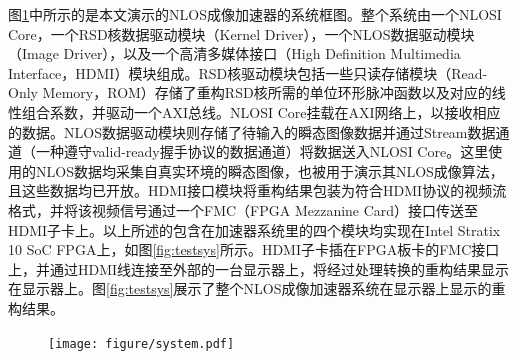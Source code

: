 \documentclass[master]{shtthesis}             %
\begin{document}
图\ref{fig:nlossys}中所示的是本文演示的NLOS成像加速器的系统框图。整个系统由一个NLOSI Core，一个RSD核数据驱动模块（Kernel Driver），一个NLOS数据驱动模块（Image Driver），以及一个高清多媒体接口（High Definition Multimedia Interface，HDMI）模块组成。RSD核驱动模块包括一些只读存储模块（Read-Only Memory，ROM）存储了重构RSD核所需的单位环形脉冲函数以及对应的线性组合系数，并驱动一个AXI总线。NLOSI Core挂载在AXI网络上，以接收相应的数据。NLOS数据驱动模块则存储了待输入的瞬态图像数据并通过Stream数据通道（一种遵守valid-ready握手协议的数据通道）将数据送入NLOSI Core。这里使用的NLOS数据均采集自真实环境的瞬态图像，也被\citet{Liu,Liu2019}用于演示其NLOS成像算法，且这些数据均已开放。HDMI接口模块将重构结果包装为符合HDMI协议的视频流格式，并将该视频信号通过一个FMC（FPGA Mezzanine Card）接口传送至HDMI子卡上。以上所述的包含在加速器系统里的四个模块均实现在Intel Stratix 10 SoC FPGA上，如图\ref{fig:testsys}所示。HDMI子卡插在FPGA板卡的FMC接口上，并通过HDMI线连接至外部的一台显示器上，将经过处理转换的重构结果显示在显示器上。图\ref{fig:testsys}展示了整个NLOS成像加速器系统在显示器上显示的重构结果。
\begin{table}[!t]
    \centering
    \label{tab:perf_comp}
\end{table}

\begin{figure}[!tb]
  \centering
  \texttt{[image: figure/system.pdf]}
  \label{fig:nlossys}
\end{figure}
\end{document}
